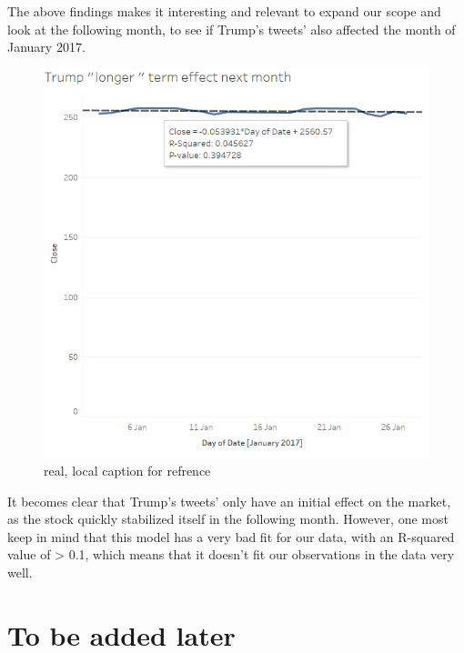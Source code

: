 \documentclass[11pt]{article}
\begin{document}
The above findings makes it interesting and relevant to expand our scope and look at the following month, to see if Trump's tweets' also affected the month of January 2017.

\begin{figure}[H] %
	\centering %
\includegraphics [scale= .6]  {TrumpJanuaryEffect.PNG}    %
	\caption[Optional caption] {real, local caption for refrence}
	\label{fig:wordcloudBliz}

\end{figure}

It becomes clear that Trump's tweets' only have an initial effect on the market, as the stock quickly stabilized itself in the following month. However, one most keep in mind that this model has a very bad fit for our data, with an R-squared value of > 0.1, which means that it doesn't fit our observations in the data very well. 




\section{To be added later}
\end{document}
